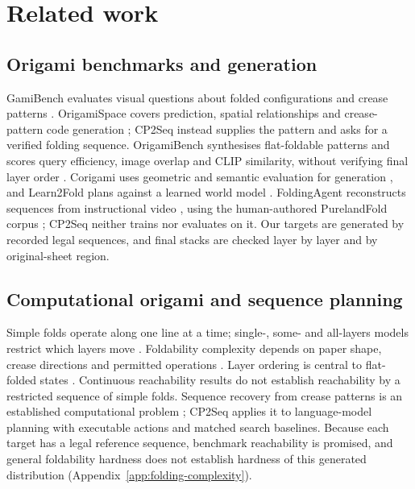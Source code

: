 \section{Related work}
\label{sec:related}
\subsection{Origami benchmarks and generation}
\label{sec:related-benchmarks}
GamiBench evaluates visual questions about folded configurations and crease patterns
\citep{gamibench}. OrigamiSpace covers prediction, spatial relationships and crease-pattern
code generation \citep{origamispace}; CP2Seq instead supplies the pattern and asks for a
verified folding sequence. OrigamiBench synthesises flat-foldable patterns and scores
query efficiency, image overlap and CLIP similarity, without verifying final layer order
\citep{origamibench}. Corigami uses geometric and semantic evaluation for generation
\citep{corigami}, and Learn2Fold plans against a learned world model \citep{learn2fold}.
FoldingAgent reconstructs sequences from instructional video \citep{foldingagent}, using
the human-authored PurelandFold corpus \citep{purelandfold}; CP2Seq neither trains nor
evaluates on it. Our targets are generated by recorded legal sequences, and final stacks
are checked layer by layer and by original-sheet region.

\subsection{Computational origami and sequence planning}
\label{sec:related-theory}
Simple folds operate along one line at a time; single-, some- and all-layers models
restrict which layers move \citep{arkin-map}. Foldability complexity depends on paper
shape, crease directions and permitted operations \citep{akitaya-hard,akitaya-infinite,mixed-orthogonal}.
Layer ordering is central to flat-folded states
\citep{bern-hayes,akitaya-flatfolder,layer-algebra,flat-folding-graphs}.
Continuous reachability results \citep{continuous,reaching-folded} do not establish
reachability by a restricted sequence of simple folds. Sequence recovery from crease
patterns is an established computational problem \citep{akitaya-cp2seq}; CP2Seq applies
it to language-model planning with executable actions and matched search baselines.
Because each target has a legal reference sequence, benchmark reachability is promised,
and general foldability hardness does not establish hardness of this generated distribution
(Appendix~\ref{app:folding-complexity}).
